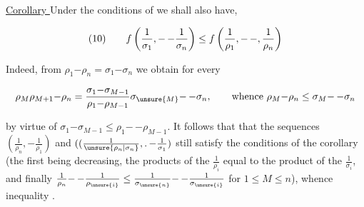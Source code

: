 \uline{Corollary } Under the conditions of       we shall also have, 

\[
\begin{array}{@{}l@{\qquad}l@{}}
(10)&\displaystyle f\left(\frac1{\sigma_1},\mathord{-}\,\mathord{-}\frac1{\sigma_n}\right)\leq f\left(\frac1{\rho_1},\mathord{-}\,\mathord{-},\frac1{\rho_n}\right)
\end{array}
\]

Indeed, from $\rho_1\mathord{-}\rho_n=\sigma_1\mathord{-}\sigma_n$ we obtain for every
{\reversemarginpar{}}

\[
\rho_M\rho_{M+1}\mathord{-}\rho_n=\frac{\sigma_1\mathord{-}\sigma_{M-1}}{\rho_1\mathord{-}\rho_{M-1}}\sigma_{\unsure{M}}\mathord{-}\,\mathord{-}\sigma_n,\qquad\text{whence }\rho_M\mathord{-}\rho_n\leq\sigma_M\mathord{-}\,\mathord{-}\sigma_n
\]

by virtue of $\sigma_1\mathord{-}\sigma_{M-1}\leq\rho_1\mathord{-}\,\mathord{-}\rho_{M-1}$. It follows that that the sequences $(\frac1{\rho_n},\mathord{-}\frac1{\rho_1})$ and $((\frac1{\unsure{\rho_n|\sigma_n}},\mathord{.}\,\mathord{-}\frac1{\sigma_1})$ still satisfy the conditions of the corollary (the first being decreasing, the products  of the $\frac1{\rho_i}$ equal to the product of the $\frac1{\sigma_i}$, and finally $\frac1{\rho_n}\mathord{-}\,\mathord{-}\frac1{\rho_{\unsure{i}}}\leq\frac1{\sigma_{\unsure{n}}}\mathord{-}\,\mathord{-}\frac1{\sigma_{\unsure{i}}}$ for $1\leq M\leq n$), whence inequality .

{\reversemarginpar{}}
